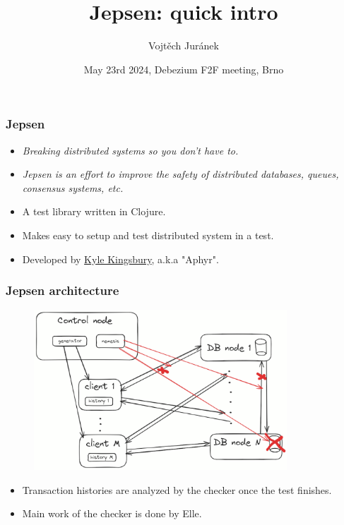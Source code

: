 \documentclass[10pt,utf8]{beamer}
\title{Jepsen: quick intro}
\author{Vojtěch Juránek}
\institute[Red Hat]{Red Hat}
\date{May 23rd 2024, Debezium F2F meeting, Brno}
\begin{document}
\begin{frame}
    \titlepage
\end{frame}

\begin{frame}
    \frametitle{Jepsen}
    \begin{itemize}
      \item \textit{Breaking distributed systems so you don't have to.}
      \item \textit{Jepsen is an effort to improve the safety of distributed databases, queues, consensus systems, etc.} 
    \end{itemize}
    
    \vspace{1cm}
    
    \begin{itemize}
      \item A test library written in Clojure.
      \item Makes easy to setup and test distributed system in a test.
      \item Developed by \color{blue}\href{https://aphyr.com/about}{Kyle Kingsbury}\color{black}, a.k.a "Aphyr".
    \end{itemize}
\end{frame}

\begin{frame}
    \frametitle{Jepsen architecture}
    \begin{figure}
        \centering
        \includegraphics[height=6cm]{./img/jepsen_nodes.eps}
    \end{figure}
    \begin{itemize}
      \item Transaction histories are analyzed by the checker once the test finishes. \\
      \item Main work of the checker is done by Elle.
    \end{itemize}
\end{frame}
\end{document}

